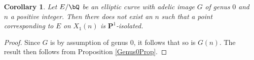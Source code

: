 \documentclass[11pt,reqno]{amsart}
\theoremstyle{plain}
\newtheorem{corollary}[theorem]{Corollary}
\theoremstyle{definition}
\newcommand{\Q}{\bQ}
\newcommand{\Z}{\bZ}
\newcommand{\PP}{\mathbf P}
\begin{document}
\begin{corollary}
Let $E/\Q$ be an elliptic curve with adelic image $G$ of genus $0$ and $n$ a positive integer. Then there does not exist an $n$ such that a point corresponding to $E$ on $X_1(n)$ is $\PP^1$-isolated.
\end{corollary}
\begin{proof}
Since $G$ is by assumption of genus $0$, it follows that so is $G(n)$. The result then follows from Proposition \ref{Genus0Prop}.
\end{proof}

\begin{comment}
are of degree $d$. 
Let $x'\in f^{-1}(x) \subseteq X_{B}$ be a point corresponding to $E$, and let $g\colon X_{B}\rightarrow X_1(n)$ be the map induced by the inclusion $B_1(N) \supseteq B$. The point $x'$ lies on a $\PP^1$ inside $X_B^{(d)}$ and hence $g(x')$ lies on a $\PP^1$ inside $X_1(n)^{(d)}$. Since no Abelian variety has $\PP^1$ as a subvariety, $\Phi_d$ contracts this $\PP^1$ inside $X_1(n)^{(d)}$ to a single point; it follows that $g(x')$ is not $\PP^1$-isolated. 







We have the following commutative diagram:

$$
\xymatrix{
& X_B \ar[r]^{g} \ar[d]^{f} & X_1(N) \ar[d]^{q} \\
&X_{G(N)} \ar[r]^{h} & X_{G'},
}
$$
where $G'$ is defined to be the subgroup of $\GL_2(\Z/N\Z)$ generated by the union of $B_1(N)$ and $G(N)$, and the maps $q:X_1(N) \rightarrow X_{G'}$ and $h:X_G(N) \rightarrow X_{G'}$ are induced by the inclusion of the corresponding subgroups. The curve $X_{G'}$ is obviously of genus $0$ as it is covered by $X_{G(N)}$ of genus 0. 

As $g(x')$ is of degree $d$ and $q(g(x'))=h(x)\in X_{G'}(\Q)$, it follows $\deg q\geq d$. Alternatively, the same conclusion follows from $\deg q=[\pm G':\pm B_1(N)]\geq [\pm G':\pm B]=d. $


\end{comment}
\end{document}
